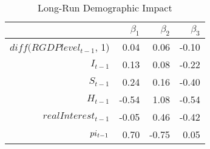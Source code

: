 \begin{table}[ht]
\centering
\begin{tabular}{rrrr}
  \hline
 & $\beta_1$ & $\beta_2$ & $\beta_3$ \\ 
  \hline
$diff(RGDPlevel_{t-1}$, 1) & 0.04 & 0.06 & -0.10 \\ 
  $I_{t-1}$ & 0.13 & 0.08 & -0.22 \\ 
  $S_{t-1}$ & 0.24 & 0.16 & -0.40 \\ 
  $H_{t-1}$ & -0.54 & 1.08 & -0.54 \\ 
  $realInterest_{t-1}$ & -0.05 & 0.46 & -0.42 \\ 
  $\\pi_{t-1}$ & 0.70 & -0.75 & 0.05 \\ 
   \hline
\end{tabular}
\caption{Long-Run Demographic Impact} 
\end{table}
